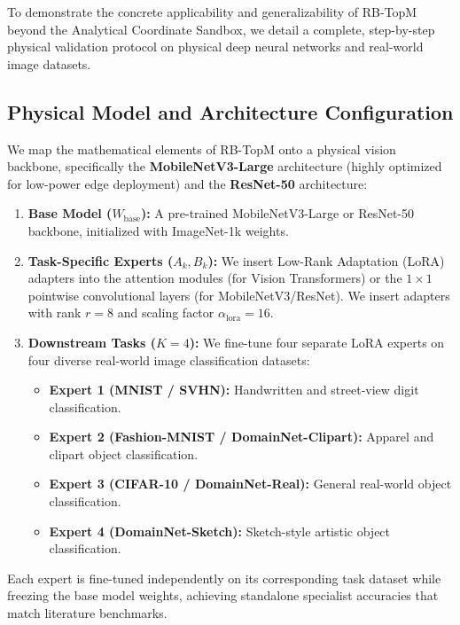 \documentclass{article}
\theoremstyle{plain}
\theoremstyle{definition}
\theoremstyle{remark}
\begin{document}
To demonstrate the concrete applicability and generalizability of RB-TopM beyond the Analytical Coordinate Sandbox, we detail a complete, step-by-step physical validation protocol on physical deep neural networks and real-world image datasets.

\subsection{Physical Model and Architecture Configuration}
We map the mathematical elements of RB-TopM onto a physical vision backbone, specifically the \textbf{MobileNetV3-Large} architecture (highly optimized for low-power edge deployment) and the \textbf{ResNet-50} architecture:
\begin{enumerate}
    \item \textbf{Base Model ($W_{\text{base}}$):} A pre-trained MobileNetV3-Large or ResNet-50 backbone, initialized with ImageNet-1k weights.
    \item \textbf{Task-Specific Experts ($A_k, B_k$):} We insert Low-Rank Adaptation (LoRA) adapters into the attention modules (for Vision Transformers) or the $1 \times 1$ pointwise convolutional layers (for MobileNetV3/ResNet). We insert adapters with rank $r = 8$ and scaling factor $\alpha_{\text{lora}} = 16$.
    \item \textbf{Downstream Tasks ($K = 4$):} We fine-tune four separate LoRA experts on four diverse real-world image classification datasets:
    \begin{itemize}
        \item \textbf{Expert 1 (MNIST / SVHN):} Handwritten and street-view digit classification.
        \item \textbf{Expert 2 (Fashion-MNIST / DomainNet-Clipart):} Apparel and clipart object classification.
        \item \textbf{Expert 3 (CIFAR-10 / DomainNet-Real):} General real-world object classification.
        \item \textbf{Expert 4 (DomainNet-Sketch):} Sketch-style artistic object classification.
    \end{itemize}
\end{enumerate}

Each expert is fine-tuned independently on its corresponding task dataset while freezing the base model weights, achieving standalone specialist accuracies that match literature benchmarks.
\end{document}
